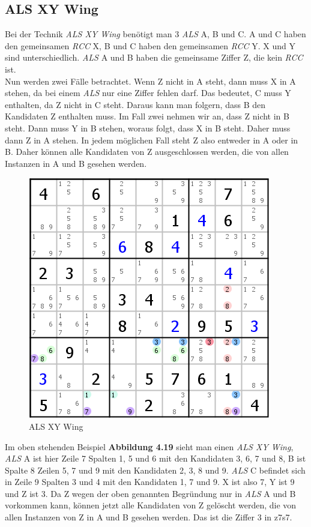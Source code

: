 \newpage
\subsection{ALS XY Wing}
Bei der Technik \textit{ALS XY Wing} benötigt man 3 \textit{ALS} A, B und C. A und C haben den gemeinsamen \textit{RCC} X, B und C haben den gemeinsamen \textit{RCC} Y. X und Y sind unterschiedlich. \textit{ALS} A und B haben die gemeinsame Ziffer Z, die kein \textit{RCC} ist.\\
Nun werden zwei Fälle betrachtet. Wenn Z nicht in A steht, dann muss X in A stehen, da bei einem \textit{ALS} nur eine Ziffer fehlen darf. Das bedeutet, C muss Y enthalten, da Z nicht in C steht. Daraus kann man folgern, dass B den Kandidaten Z enthalten muss. Im Fall zwei nehmen wir an, dass Z nicht in B steht. Dann muss Y in B stehen, woraus folgt, dass X in B steht. Daher muss dann Z in A stehen. In jedem möglichen Fall steht Z also entweder in A oder in B. Daher können alle Kandidaten von Z ausgeschlossen werden, die von allen Instanzen in A und B gesehen werden.

\begin{figure}[h]
\begin{center}
\includegraphics{./img/ALS_XY_Wing.png}
\caption{ALS XY Wing}
\end{center}
\end{figure}

Im oben stehenden Beispiel \textbf{Abbildung 4.19} sieht man einen \textit{ALS XY Wing}, \textit{ALS} A ist hier Zeile 7 Spalten 1, 5 und 6 mit den Kandidaten 3, 6, 7 und 8, B ist Spalte 8 Zeilen 5, 7 und 9 mit den Kandidaten 2, 3, 8 und 9. \textit{ALS} C befindet sich in Zeile 9 Spalten 3 und 4 mit den Kandidaten 1, 7 und 9. X ist also 7, Y ist 9 und Z ist 3. Da Z wegen der oben genannten Begründung nur in \textit{ALS} A und B vorkommen kann, können jetzt alle Kandidaten von Z gelöscht werden, die von allen Instanzen von Z in A und B gesehen werden. Das ist die Ziffer 3 in z7s7.